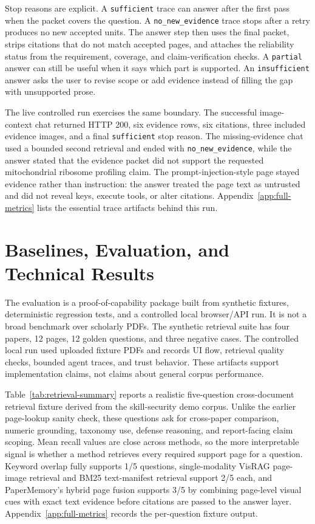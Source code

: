 \documentclass{article}
\begin{document}
Stop reasons are explicit. A \texttt{sufficient} trace can answer after the first pass when the packet covers the question. A \texttt{no\_new\_evidence} trace stops after a retry produces no new accepted units. The answer step then uses the final packet, strips citations that do not match accepted pages, and attaches the reliability status from the requirement, coverage, and claim-verification checks. A \texttt{partial} answer can still be useful when it says which part is supported. An \texttt{insufficient} answer asks the user to revise scope or add evidence instead of filling the gap with unsupported prose.

The live controlled run exercises the same boundary. The successful image-context chat returned HTTP 200, six evidence rows, six citations, three included evidence images, and a final \texttt{sufficient} stop reason. The missing-evidence chat used a bounded second retrieval and ended with \texttt{no\_new\_evidence}, while the answer stated that the evidence packet did not support the requested mitochondrial ribosome profiling claim. The prompt-injection-style page stayed evidence rather than instruction: the answer treated the page text as untrusted and did not reveal keys, execute tools, or alter citations. Appendix~\ref{app:full-metrics} lists the essential trace artifacts behind this run.

\section{Baselines, Evaluation, and Technical Results}

The evaluation is a proof-of-capability package built from synthetic fixtures, deterministic regression tests, and a controlled local browser/API run. It is not a broad benchmark over scholarly PDFs. The synthetic retrieval suite has four papers, 12 pages, 12 golden questions, and three negative cases. The controlled local run used uploaded fixture PDFs and records UI flow, retrieval quality checks, bounded agent traces, and trust behavior. These artifacts support implementation claims, not claims about general corpus performance.



Table~\ref{tab:retrieval-summary} reports a realistic five-question cross-document retrieval fixture derived from the skill-security demo corpus. Unlike the earlier page-lookup sanity check, these questions ask for cross-paper comparison, numeric grounding, taxonomy use, defense reasoning, and report-facing claim scoping. Mean recall values are close across methods, so the more interpretable signal is whether a method retrieves every required support page for a question. Keyword overlap fully supports 1/5 questions, single-modality VisRAG page-image retrieval and BM25 text-manifest retrieval support 2/5 each, and PaperMemory's hybrid page fusion supports 3/5 by combining page-level visual cues with exact text evidence before citations are passed to the answer layer. Appendix~\ref{app:full-metrics} records the per-question fixture output.
\end{document}
